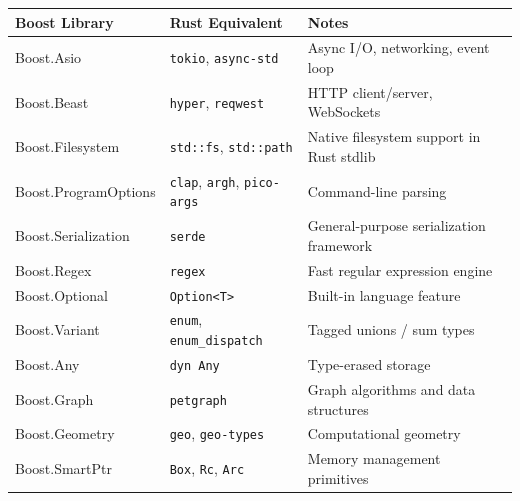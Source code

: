 \begin{table}[H]
    \centering

    \begin{tabular}{|l|l|l|}
        \hline
        \textbf{Boost Library} &
        \textbf{Rust Equivalent} &
        \textbf{Notes} \\ \hline

        Boost.Asio &
        \texttt{tokio}, \texttt{async-std} &
        Async I/O, networking, event loop \\ \hline

        Boost.Beast &
        \texttt{hyper}, \texttt{reqwest} &
        HTTP client/server, WebSockets \\ \hline

        Boost.Filesystem &
        \texttt{std::fs}, \texttt{std::path} &
        Native filesystem support in Rust stdlib \\ \hline

        Boost.ProgramOptions &
        \texttt{clap}, \texttt{argh}, \texttt{pico-args} &
        Command-line parsing \\ \hline

        Boost.Serialization &
        \texttt{serde} &
        General-purpose serialization framework \\ \hline

        Boost.Regex &
        \texttt{regex} &
        Fast regular expression engine \\ \hline

        Boost.Optional &
        \texttt{Option<T>} &
        Built-in language feature \\ \hline

        Boost.Variant &
        \texttt{enum}, \texttt{enum\_dispatch} &
        Tagged unions / sum types \\ \hline

        Boost.Any &
        \texttt{dyn Any} &
        Type-erased storage \\ \hline

        Boost.Graph &
        \texttt{petgraph} &
        Graph algorithms and data structures \\ \hline

        Boost.Geometry &
        \texttt{geo}, \texttt{geo-types} &
        Computational geometry \\ \hline

        Boost.SmartPtr &
        \texttt{Box}, \texttt{Rc}, \texttt{Arc} &
        Memory management primitives \\ \hline


\end{tabular}
\end{table}
